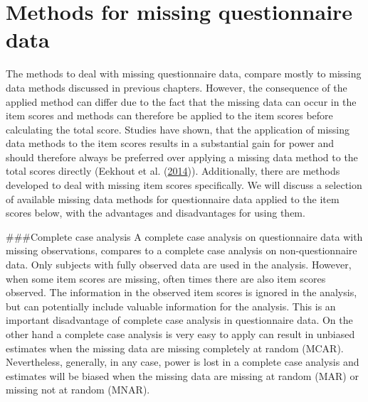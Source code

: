 \documentclass[
]{book}
\begin{document}
\hypertarget{methods-for-missing-questionnaire-data}{%
\section{Methods for missing questionnaire
data}\label{methods-for-missing-questionnaire-data}}

The methods to deal with missing questionnaire data, compare mostly to
missing data methods discussed in previous chapters. However, the
consequence of the applied method can differ due to the fact that the
missing data can occur in the item scores and methods can therefore be
applied to the item scores before calculating the total score. Studies
have shown, that the application of missing data methods to the item
scores results in a substantial gain for power and should therefore
always be preferred over applying a missing data method to the total
scores directly (Eekhout et al.
(\protect\hyperlink{ref-Eekhout2014}{2014})). Additionally, there are
methods developed to deal with missing item scores specifically. We will
discuss a selection of available missing data methods for questionnaire
data applied to the item scores below, with the advantages and
disadvantages for using them.

\#\#\#Complete case analysis A complete case analysis on questionnaire
data with missing observations, compares to a complete case analysis on
non-questionnaire data. Only subjects with fully observed data are used
in the analysis. However, when some item scores are missing, often times
there are also item scores observed. The information in the observed
item scores is ignored in the analysis, but can potentially include
valuable information for the analysis. This is an important disadvantage
of complete case analysis in questionnaire data. On the other hand a
complete case analysis is very easy to apply can result in unbiased
estimates when the missing data are missing completely at random (MCAR).
Nevertheless, generally, in any case, power is lost in a complete case
analysis and estimates will be biased when the missing data are missing
at random (MAR) or missing not at random (MNAR).
\end{document}
